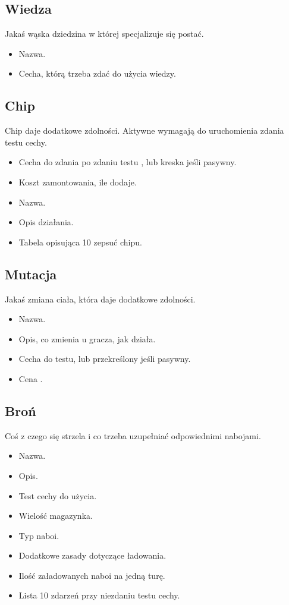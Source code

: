 \subsection{Wiedza}
Jakaś wąska dziedzina w której specjalizuje się postać.
\begin{itemize}
 \item Nazwa.
 \item Cecha, którą trzeba zdać do użycia wiedzy.
\end{itemize}

\subsection{Chip}
Chip daje dodatkowe zdolności.
Aktywne wymagają do uruchomienia zdania testu cechy.
\begin{itemize}
 \item Cecha do zdania po zdaniu testu \abnkp{}, lub kreska jeśli pasywny.
 \item Koszt zamontowania, ile \abnkp{} dodaje.
 \item Nazwa.
 \item Opis działania.
 \item Tabela opisująca 10 zepsuć chipu.
\end{itemize}

\subsection{Mutacja}
Jakaś zmiana ciała, która daje dodatkowe zdolności.
\begin{itemize}
 \item Nazwa.
 \item Opis, co zmienia u gracza, jak działa.
 \item Cecha do testu, lub przekreślony jeśli pasywny.
 \item Cena \abnkp{}. 
\end{itemize}

\subsection{Broń}
Coś z czego się strzela i co trzeba uzupełniać odpowiednimi nabojami.
\begin{itemize}
 \item Nazwa.
 \item Opis.
 \item Test cechy do użycia.
 \item Wielość magazynka.
 \item Typ naboi.
 \item Dodatkowe zasady dotyczące ładowania.
 \item Ilość załadowanych naboi na jedną turę.
 \item Lista 10 zdarzeń przy niezdaniu testu cechy.
\end{itemize}











